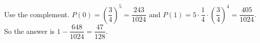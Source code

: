 Use the complement. $P(0)=\left(\dfrac34\right)^5=\dfrac{243}{1024}$ and $P(1)=5\cdot\dfrac14\cdot\left(\dfrac34\right)^4=\dfrac{405}{1024}$. So the answer is $1-\dfrac{648}{1024}=\boxed{\dfrac{47}{128}}$.
